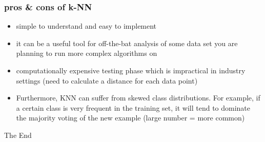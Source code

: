 \documentclass{beamer}
\begin{document}
\begin{frame}
\end{frame}


\begin{frame}
\frametitle{pros \& cons of k-NN}
\begin{itemize}
\item simple to understand and easy to implement
\item  it can be a useful tool for off-the-bat analysis of some data set you are planning to run more complex algorithms on
\item computationally expensive testing phase which is impractical in industry settings (need to calculate a distance for each data point)
\item Furthermore, KNN can suffer from skewed class distributions. For example, if a certain class is very frequent in the training set, it will tend to dominate the majority voting of the new example (large number = more common)
\end{itemize}
\end{frame}







\begin{frame}
\Huge{\centerline{The End}}
\end{frame}

\end{document}
